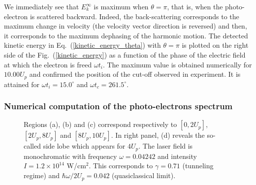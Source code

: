 \documentclass[a4paper]{article}
\begin{document}
We immediately see that $E_{k}^{\infty}$ is maximum when $\theta=\pi$, that is, when the photo-electron is scattered backward. Indeed, the back-scattering corresponds to the maximum change in velocity (the velocity vector direction is reversed) and then, it corresponds to the maximum dephasing of the harmonic motion. The detected kinetic energy in Eq.~(\ref{kinetic_energy_theta}) with $\theta=\pi$ is plotted on the right side of the Fig.~(\ref{kinetic_energy}) as a function of the phase of the electric field at which the electron is freed $\omega t_{i}$.
The maximum value is obtained numerically for $10.00 U_{p}$ and confirmed the position of the cut-off observed in experiment. It is attained for $\omega t_{i}=15.0^{\circ}$ and $\omega t_{c}=261.5^{\circ}$.


\subsubsection{Numerical computation of the photo-electrons spectrum}
\label{computation_pes}

\begin{figure}[htp]
\begin{subfigure} [t]{0.5\textwidth}
 \resizebox{1\textwidth}{!}{}
\end{subfigure}
\begin{subfigure} [t]{0.5\textwidth}
\hspace{-1.5cm}
 \resizebox{1.6\textwidth}{!}{}
\end{subfigure}
 \caption{Regions (a), (b) and (c) correspond respectively to $[0, 2U_{p}]$, $[2U_{p}, 8U_{p}]$ and $[8U_{p}, 10U_{p}]$. In right panel, (d) reveals the so-called side lobe which appears for $4U_{p}$. The laser field is monochromatic with frequency $\omega=0.04242$ and intensity $I=1.2\times10^{14}$ W/cm$^{2}$. This corresponds to $\gamma=0.71$ (tunneling regime) and $\hbar\omega/2U_{p}=0.042$ (quasiclassical limit).}
\end{figure}
\end{document}
